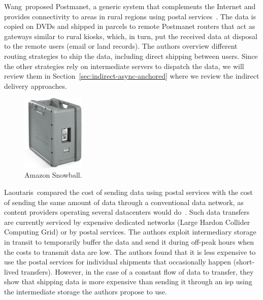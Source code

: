 Wang~\etal proposed Postmanet, a generic system that complements the Internet and provides connectivity to areas in rural regions using postal services~\cite{wang2004turning}. The data is copied on DVDs and shipped in parcels to remote Postmanet routers that act as gateways similar to rural kiosks, which, in turn, put the received data at disposal to the remote users (\eg email or land records). The authors overview different routing strategies to ship the data, including direct shipping between users. Since the other strategies rely on intermediate servers to dispatch the data, we will review them in Section~\ref{sec:indirect-async-anchored} where we review the indirect delivery approaches. 

\begin{figure}
    \centering
    \vspace{-15pt}
    \includegraphics[width=3cm]{figures/Snowball.png}
    \caption{Amazon Snowball.}
    \label{fig:snowball}
\end{figure}
Laoutaris~\etal compared the cost of sending data using postal services with the cost of sending the same amount of data through a conventional data network, as content providers operating several datacenters would do~\cite{laoutaris2009delay,laoutaris2013delay}. Such data transfers are currently serviced by expensive dedicated networks (\eg Large Hardon Collider Computing Grid) or by postal services. The authors exploit intermediary storage in transit  to temporarily buffer the data and send it during off-peak hours when the costs to transmit data are low. The authors found that it is less expensive to use the postal services for individual shipments that occasionally happen (\eg short-lived transfers). However, in the case of a constant flow of data to transfer, they show that shipping data is more expensive than sending it through an \acrshort{isp} using the intermediate storage the authors propose to use.

